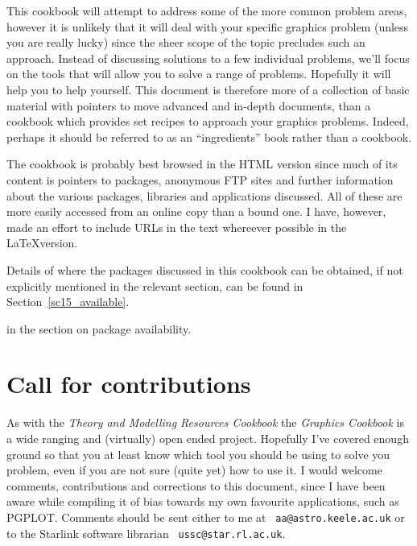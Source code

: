 \documentclass[twoside,11pt]{article}
\newcommand{\htmladdnormallink}[2]{#1}
\newcommand{\htmlref}[2]{#1}
\newcommand{\latex}[1]{#1}
\newcommand{\xref}[3]{#1}
\newcommand{\xlabel}[1]{}
\begin{document}
This cookbook will attempt to address some of the more common problem
areas, however it is unlikely that it will deal with your specific
graphics problem (unless you are really lucky) since the sheer scope
of the topic precludes such an approach. Instead of discussing
solutions to a few individual problems, we'll focus on the tools that
will allow you to solve a range of problems. Hopefully it will help
you to help yourself. This document is therefore more of a collection
of basic material with pointers to move advanced and in-depth
documents, than a cookbook which provides set recipes to approach your
graphics problems. Indeed, perhaps it should be referred to as an
``ingredients'' book rather than a cookbook.

The cookbook is probably best browsed in the HTML version since much
of its content is pointers to packages, anonymous FTP sites and
further information about the various packages, libraries and
applications discussed. All of these are more easily accessed from an
online copy than a bound one. I have, however, made an effort to
include URLs in the text whereever possible in the \LaTeX version.

Details of where the packages discussed in this cookbook can be
obtained, if not explicitly mentioned in the relevant section, can be
found \latex{ in Section~\ref{sc15_available}.}
\begin{htmlonly}
in the section on \htmlref{package availability}{sc15_available}.
\end{htmlonly}

\section{\xlabel{sc15_call}Call for contributions\label{sc15_call}}

As with the \xref{{\em Theory and Modelling Resources
Cookbook}}{sc13}{} the {\em Graphics Cookbook} is a wide ranging and
(virtually) open ended project. Hopefully I've covered enough ground
so that you at least know which tool you should be using to solve you
problem, even if you are not sure (quite yet) how to use it. I would
welcome comments, contributions and corrections to this document,
since I have been aware while compiling it of bias towards my own
favourite applications, such as PGPLOT. Comments should be sent either
to me at \htmladdnormallink{{\tt
aa@astro.keele.ac.uk}}{mailto:aa@astro.keele.ac.uk} or to the Starlink
software librarian \htmladdnormallink{{\tt
ussc@star.rl.ac.uk}}{mailto:ussc@star.rl.ac.uk}.
\end{document}
